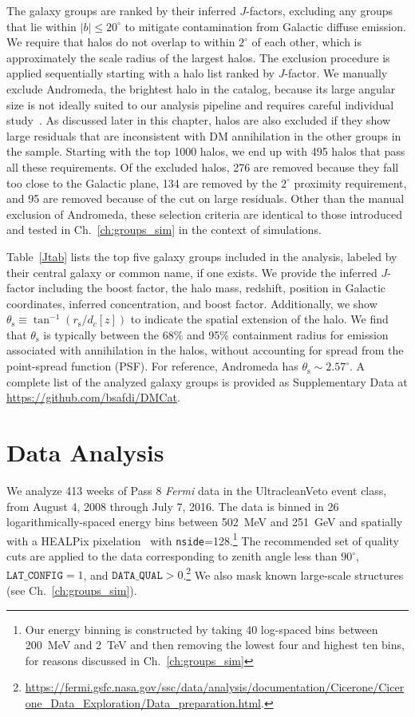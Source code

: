 The galaxy groups are ranked by their inferred $J$-factors, excluding any groups that lie within $|b| \leq 20^\circ$ to mitigate contamination from Galactic diffuse emission.  We require that halos do not overlap to within $2^\circ$ of each other, which is approximately the scale radius of the largest halos.  The exclusion procedure is applied sequentially starting with a halo list ranked by $J$-factor.  We manually exclude Andromeda, the brightest halo in the catalog, because its large angular size is not ideally suited to our analysis pipeline and requires careful individual study~\cite{Ackermann:2017nya}.  
As discussed later in this chapter, halos are also excluded if they show large residuals that are inconsistent with DM annihilation in the other groups in the sample.  Starting with the top 1000 halos, we end up with 495 halos that pass all these requirements.  Of the excluded halos, 276 are removed because they fall too close to the Galactic plane, 134 are removed by the $2^\circ$ proximity requirement, and 95 are removed because of the cut on large residuals. Other than the manual exclusion of Andromeda, these selection criteria are identical to those introduced and tested in Ch.~\ref{ch:groups_sim} in the context of simulations.

Table~\ref{Jtab} lists the top five galaxy groups included in the analysis, labeled by their central galaxy or common name, if one exists.  We provide the inferred $J$-factor including the boost factor, the halo mass, redshift, position in Galactic coordinates, inferred concentration, and boost factor.  Additionally, we show $\theta_\text{s} \equiv \tan^{-1} (r_\text{s} / d_c[z])$ to indicate the spatial extension of the halo.  We find that $\theta_\text{s}$ is typically between the 68\% and 95\% containment radius for emission associated with annihilation in the halos, without accounting for spread from the point-spread function (PSF).  For reference, Andromeda has $\theta_\text{s} \sim 2.57^\circ$. A complete list of the analyzed galaxy groups is provided as Supplementary Data at \url{https://github.com/bsafdi/DMCat}.

\section{Data Analysis}

We analyze 413 weeks of Pass 8 {\it Fermi} data in the UltracleanVeto event class, from August 4, 2008 through July 7, 2016.  The data is binned in 26 logarithmically-spaced energy bins between 502~MeV and 251~GeV and spatially with a HEALPix pixelation~\cite{Gorski:2004by} with \texttt{nside}=128.\footnote{Our energy binning is constructed by taking 40 log-spaced bins between 200~MeV and 2~TeV and then removing the lowest four and highest ten bins, for reasons discussed in Ch.~\ref{ch:groups_sim} }  The recommended set of quality cuts are applied to the data corresponding to zenith angle less than $90^\circ$, $\texttt{LAT\_CONFIG}=1$, and $\texttt{DATA\_QUAL}>0$.\footnote{\url{https://fermi.gsfc.nasa.gov/ssc/data/analysis/documentation/Cicerone/Cicerone_Data_Exploration/Data_preparation.html}.}  We also mask known large-scale structures (see Ch.~\ref{ch:groups_sim}).

